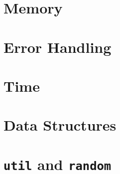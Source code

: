 %
% 
% 
\def\FileCreated{Fri Jun 22 19:33:30 2001}
\def\FileRevised{Fri Jun 22 19:34:41 2001}

\section{Memory}
\label{sec:memory}

\section{Error Handling}
\label{sec:errorhandling}

\section{Time}
\label{sec:time}

\section{Data Structures}
\label{sec:datastructures}

\section{{\tt util} and {\tt random}}
\label{sec:util}

